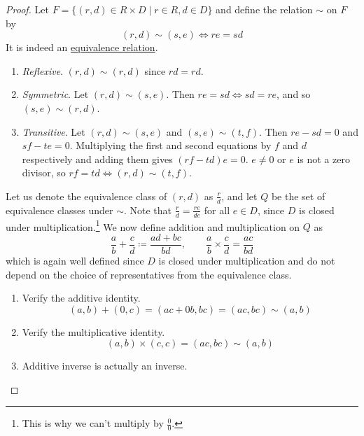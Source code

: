   \begin{proof}
    Let $F = \{(r, d) \in R \times D \mid r \in R, d \in D \}$ and define the relation $\sim$ on $F$ by 
    \begin{equation}
      (r, d) \sim (s, e) \iff re = sd
    \end{equation}
    It is indeed an \hyperref[st-def:equivalence_relation]{equivalence relation}. 
    \begin{enumerate}
      \item \textit{Reflexive}. $(r, d) \sim (r, d)$ since $rd = rd$. 
      \item \textit{Symmetric}. Let $(r, d) \sim (s, e)$. Then $re = sd \iff sd = re$, and so $(s, e) \sim (r, d)$. 
      \item \textit{Transitive}. Let $(r, d) \sim (s, e)$ and $(s, e) \sim (t, f)$. Then $re - sd = 0$ and $sf - te = 0$. Multiplying the first and second equations by $f$ and $d$ respectively and adding them gives $(rf - td) e = 0$. $e \neq 0$ or $e$ is not a zero divisor, so $rf = td \iff (r, d) \sim (t, f)$. 
    \end{enumerate}
    Let us denote the equivalence class of $(r, d)$ as $\frac{r}{d}$, and let $Q$ be the set of equivalence classes under $\sim$. Note that $\frac{r}{d} = \frac{re}{de}$ for all $e \in D$, since $D$ is closed under multiplication.\footnote{This is why we can't multiply by $\frac{0}{0}$.} We now define addition and multiplication on $Q$ as 
    \begin{equation}
      \frac{a}{b} + \frac{c}{d} \coloneqq \frac{ad + bc}{bd}, \qquad \frac{a}{b} \times \frac{c}{d} = \frac{ac}{bd}
    \end{equation}
    which is again well defined since $D$ is closed under multiplication and do not depend on the choice of representatives from the equivalence class. 
    \begin{enumerate}
      \item Verify the additive identity. 
      \begin{equation}
        (a, b) + (0, c) = (ac + 0b, bc) = (ac, bc) \sim (a, b)
      \end{equation}
      \item Verify the multiplicative identity. 
      \begin{equation}
        (a, b) \times (c, c) = (ac, bc) \sim (a, b)
      \end{equation}
      \item Additive inverse is actually an inverse. 
      \begin{equation}

\end{equation}
\end{enumerate}
\end{proof}
